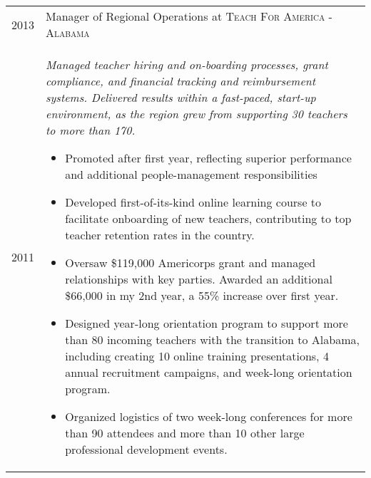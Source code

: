 \documentclass[a4paper,11pt]{article}
\begin{document}
\begin{longtable}{r|p{11cm}}
    2013 & Manager of Regional Operations at \textsc{Teach For America - Alabama} \\*
    2011 & \small{\emph{Managed teacher hiring and on-boarding processes, grant compliance, and financial tracking and reimbursement systems. Delivered results within a fast-paced, start-up environment, as the region grew from supporting 30 teachers to more than 170.}}
    \footnotesize{
    \begin{itemize}
        \item Promoted after first year, reflecting superior performance and additional people-management responsibilities
        \item Developed first-of-its-kind online learning course to facilitate onboarding of new teachers, contributing to top teacher retention rates in the country.
        \item Oversaw \$119,000 Americorps grant and managed relationships with key parties. Awarded an additional \$66,000 in my 2nd year, a 55\% increase over first year.
        \item Designed year-long orientation program to support more than 80 incoming teachers with the transition to Alabama, including creating 10 online training presentations, 4 annual recruitment campaigns, and week-long orientation program.
        \item Organized logistics of two week-long conferences for more than 90 attendees and more than 10 other large professional development events.
    \end{itemize}
    } \\*
\end{longtable}
\end{document}
